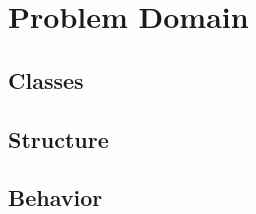 \chapter{Problem Domain}

\section{Classes}
\label{sub:pd_classes}


\section{Structure}


\section{Behavior}

